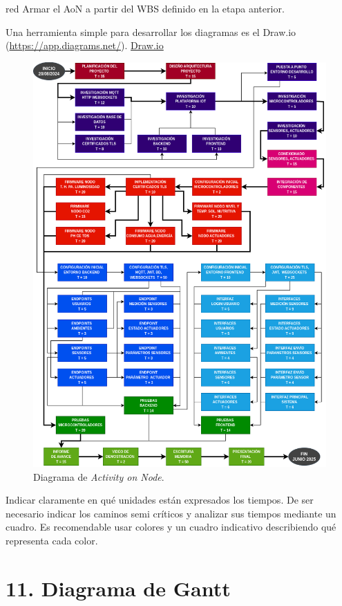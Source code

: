 \documentclass[
11pt, %
codirector, %
]{charter}
\begin{document}
\begin{consigna}{red}
	Armar el AoN a partir del WBS definido en la etapa anterior.

	Una herramienta simple para desarrollar los diagramas es el Draw.io (\url{https://app.diagrams.net/}).
	\href{https://app.diagrams.net}{Draw.io}


	\begin{figure}[htpb]
		\centering
		\includegraphics[width=.8\textwidth]{./Figuras/AoN.png}
		\caption{Diagrama de \textit{Activity on Node}.}
		\label{fig:AoN}
	\end{figure}

	Indicar claramente en qué unidades están expresados los tiempos.
	De ser necesario indicar los caminos semi críticos y analizar sus tiempos mediante un cuadro.
	Es recomendable usar colores y un cuadro indicativo describiendo qué representa cada color.

\end{consigna}

\section{11. Diagrama de Gantt}
\label{sec:gantt}
\end{document}
